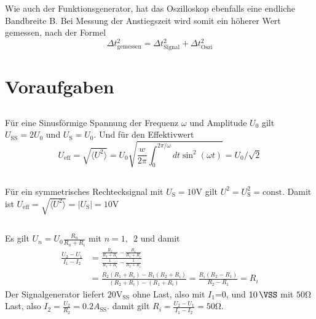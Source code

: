 \documentclass{article}
\newcommand{\subsectionAlph}{ \renewcommand{\thesubsection}{\arabic{section}.\Alph{subsection}} }
\begin{document}
Wie auch der Funktionsgenerator, hat das Oszilloskop ebenfalls eine endliche Bandbreite B. Bei Messung der Anstiegszeit
wird somit ein höherer Wert gemessen, nach der Formel
\begin{equation}
  \Delta t^2_\text{gemessen} = \Delta t^2_\text{Signal} + \Delta t^2_\text{Oszi} \label{eq:anstiegszeit-eff}
\end{equation}


\section{Voraufgaben}
\begingroup
\subsectionAlph
\subsection{}
Für eine Sinusförmige Spannung der Frequenz $\omega$ und Amplitude $U_0$ gilt $U_\text{SS} = 2U_0$ und $U_\text{S} = U_0$.
Und für den Effektivwert
\begin{equation}
  U_\text{eff} = \sqrt{\langle U^2 \rangle} = U_0 \sqrt{\frac{w}{2\pi} \int_0^{2\pi/\omega} dt \sin^2(\omega t)} = U_0/\sqrt{2}
\end{equation}

\subsection{}
Für ein symmetrisches Rechtecksignal mit $U_\text{S} = 10\text{V}$ gilt $U^2 = U_\text{S}^2 = \text{const.}$
Damit ist $U_\text{eff} = \sqrt{\langle U^2 \rangle} = \lvert U_\text{S} \rvert = 10\text{V}$

\subsection{}
Es gilt $U_n = U_0 \frac{R_n}{R_n+R_i}$ mit $n=1,\enspace 2$ und damit
\begin{align}
  \frac{U_2 - U_1}{I_1 - I_2} &= \frac{ \frac{R_2}{R_2+R_i} - \frac{R_1}{R_1+R_i}}{ \frac{1}{R_1+R_i} - \frac{1}{R_2+R_i} } \nonumber \\ 
  &= \frac{ R_2(R_1+R_i) - R_1(R_2+R_i) }{ (R_2+R_i) - (R_1+R_i) } = \frac{R_i(R_2-R_1)}{R_2-R_1} = R_i
\end{align}
Der Signalgenerator liefert $20\text{V}_\text{SS}$ ohne Last, also mit $I_1$=0, und $\SI{10}{\VSS}$ mit $50\mathrm{\Omega}$ Last,
also $I_2 = \frac{U_2}{R_2} = 0.2A_\text{SS}$. damit gilt $R_i = \frac{U_2 - U_1}{I_1 - I_2} = 50\mathrm{\Omega}$.
\end{document}
